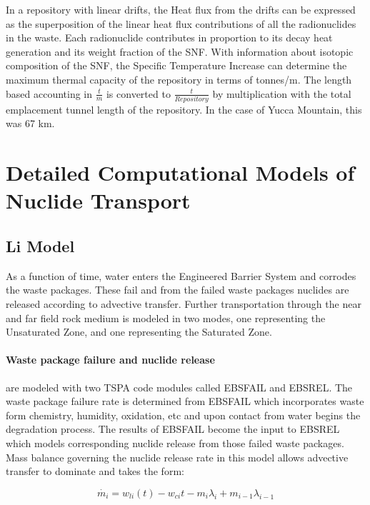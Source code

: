 In a repository with linear drifts, the Heat flux from the drifts can be
expressed as the superposition of the linear heat flux contributions of all the
radionuclides in the waste. Each radionuclide contributes in proportion to its
decay heat generation and its weight fraction of the SNF. With information
about isotopic composition of the SNF, the Specific Temperature Increase can
determine the maximum thermal capacity of the repository in terms of tonnes/m.
The length based accounting in $\frac{t}{m}$ is converted to
$\frac{t}{Repository}$ by multiplication with the total emplacement tunnel
length of the repository.  In the case of Yucca Mountain, this was 67 km.

\section{Detailed Computational Models of Nuclide Transport}
\label{sec:detailed_nuclide}


\subsection{Li Model\cite{li_methodology_2006}} As a function of time, water
enters the Engineered Barrier System and corrodes the waste packages.  These
fail and from the failed waste packages nuclides are released according to
advective transfer.  Further transportation through the near and far field rock
medium is modeled in two modes, one representing the Unsaturated Zone, and one
representing the Saturated Zone.

\paragraph{Waste package failure and nuclide release} are modeled with two TSPA
code modules called EBSFAIL and EBSREL. The waste package failure rate is
determined from EBSFAIL which incorporates waste form chemistry, humidity,
oxidation, etc and upon contact from water begins the degradation process. The
results of EBSFAIL become the input to EBSREL which models corresponding
nuclide release from those failed waste packages. Mass balance governing the
nuclide release rate in this model allows advective transfer to dominate and
takes the form:

\begin{equation}
\dot{m_i}=w_{li}(t)-w_{ci}{t}-m_i\lambda_i+m_{i-1}\lambda_{i-1}\nonumber
\end{equation}

